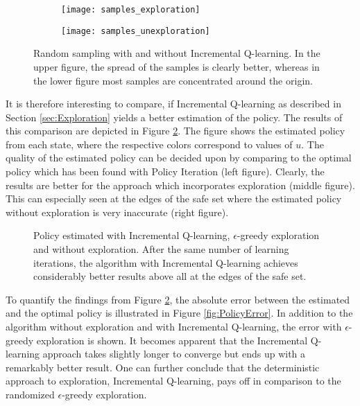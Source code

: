 \documentclass[../main.tex]{subfiles}
\begin{document}
\begin{figure}[h]
    \centering
    \begin{subfigure}[b]{\textwidth}
    \texttt{[image: samples\_exploration]}
    \end{subfigure}
    
    \begin{subfigure}[b]{\textwidth}
    \texttt{[image: samples\_unexploration]}
    \end{subfigure}
        \caption{Random sampling with and without Incremental Q-learning. In the upper figure, the spread of the samples is clearly better, whereas in the lower figure most samples are concentrated around the origin.}  \label{fig:samples_exploration}
\end{figure}

It is therefore interesting to compare, if Incremental Q-learning as described in Section \ref{sec:Exploration} yields a better estimation of the policy. The results of this comparison are depicted in Figure \ref{fig:policy_exploration}. The figure shows the estimated policy from each state, where the respective colors correspond to values of $u$. The quality of the estimated policy can be decided upon by comparing to the optimal policy which has been found with Policy Iteration (left figure). Clearly, the results are better for the approach which incorporates exploration (middle figure). This can especially seen at the edges of the safe set where the estimated policy without exploration is very inaccurate (right figure).

\begin{figure}
    \centering
    \caption{Policy estimated with Incremental Q-learning, $\epsilon$-greedy exploration and without exploration. After the same number of learning iterations, the algorithm with Incremental Q-learning achieves considerably better results above all at the edges of the safe set.} \label{fig:policy_exploration}
\end{figure}

To quantify the findings from Figure \ref{fig:policy_exploration}, the absolute error between the estimated and the optimal policy is illustrated in Figure \ref{fig:PolicyError}. In addition to the algorithm without exploration and with Incremental Q-learning, the error with $\epsilon$-greedy exploration is shown. It becomes apparent that the Incremental Q-learning approach takes slightly longer to converge but ends up with a remarkably better result. One can further conclude that the deterministic approach to exploration, Incremental Q-learning, pays off in comparison to the randomized $\epsilon$-greedy exploration. 
\end{document}
